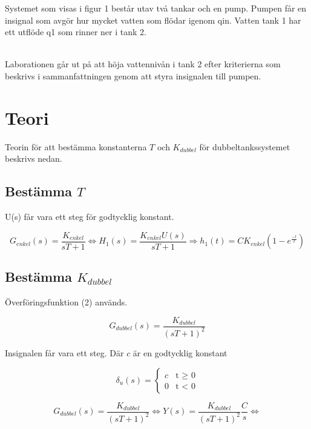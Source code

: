\documentclass[a4paper]{article}
\begin{document}
Systemet som visas i figur 1 består utav två tankar och en pump.
Pumpen får en insignal som avgör hur mycket vatten som flödar igenom qin. Vatten tank 1 har ett utflöde q1 som rinner ner i tank 2. \\\

Laborationen går ut på att höja vattennivån i tank 2 efter kriterierna som beskrivs i sammanfattningen genom att styra insignalen till pumpen. 

\section{Teori}

Teorin för att bestämma konstanterna $T$ och $K_{dubbel}$ för dubbeltankssystemet beskrivs nedan. 

\subsection{Bestämma $T$}

U(s) får vara ett steg för godtycklig konstant.

\begin{equation*}
  G_{enkel}(s)=\frac{K_{enkel}}{sT+1} \Leftrightarrow   
  H_{1}(s)=\frac{K_{enkel}U(s)}{sT+1} \Rightarrow
  h_{1}(t) = CK_{enkel}(1-e^{\frac{-t}{T}})
\end{equation*}

\subsection{Bestämma $K_{dubbel}$}

Överföringsfunktion (2) används.

\begin{equation}
  G_{dubbel}(s)=\frac{K_{dubbel}}{(sT+1)^2}
\end{equation}

Insignalen får vara ett steg. Där $c$ är en godtycklig konstant

\begin{equation*}
  \delta_{u}(s)=\begin{cases}
  c & \text{t $\geq$ 0}  \\
  0 & \text{t $<$ 0} 
\end{cases}
\end{equation*}

\begin{equation*}
  G_{dubbel}(s)=\frac{K_{dubbel}}{(sT+1)^2} \Leftrightarrow Y(s)=\frac{K_{dubbel}}{(sT+1)^2} \frac{C}{s} \Leftrightarrow
\end{equation*}
\end{document}
